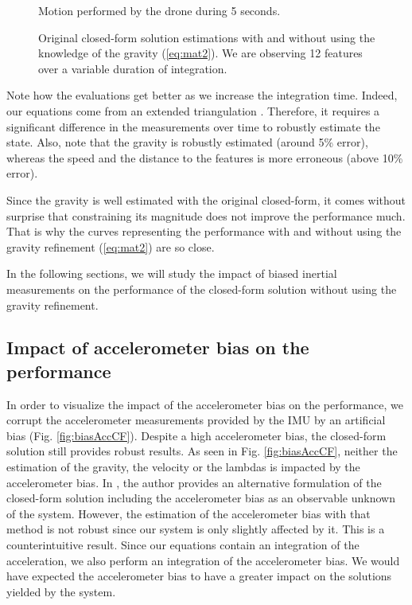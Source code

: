 \documentclass[letterpaper, 10 pt, journal, final]{ieeeconf}  %
\begin{document}
\begin{figure}
  \centering
  \resizebox{0.7\columnwidth}{!}{}
    \caption{Motion performed by the drone during 5 seconds.\label{fig:trajectory}}
\end{figure}

\begin{figure}
  \centering
    \resizebox{0.7\columnwidth}{!}{}
    \caption{Original closed-form solution estimations with and without using the knowledge of the gravity (\ref{eq:mat2}). We are observing 12 features  over a variable duration of integration.\label{fig:original}}
\end{figure}


Note how the evaluations get better as we increase the integration time.
Indeed, our equations come from an extended triangulation \cite{Martinelli2012}.
Therefore, it requires a significant difference in the measurements over time to robustly estimate the state.
Also, note that the gravity is robustly estimated (around 5\% error), whereas the speed and the distance to the features is more erroneous (above 10\% error).

Since the gravity is well estimated with the original closed-form, it comes without surprise that constraining its magnitude does not improve the performance much.
That is why the curves representing the performance with and without using the gravity refinement (\ref{eq:mat2}) are so close.

In the following sections, we will study the impact of biased inertial measurements on the performance of the closed-form solution without using the gravity refinement.

\subsection{Impact of accelerometer bias on the performance}
In order to visualize the impact of the accelerometer bias on the performance,
we corrupt the accelerometer measurements provided by the IMU by an artificial bias (Fig. \ref{fig:biasAccCF}).
Despite a high accelerometer bias, the closed-form solution still provides robust results.
As seen in Fig. \ref{fig:biasAccCF}, neither the estimation of the gravity, the velocity or the lambdas is impacted by the accelerometer bias.
In \cite{Martinelli2014}, the author provides an alternative formulation of the closed-form solution including the accelerometer bias as an observable unknown of the system.
However, the estimation of the accelerometer bias with that method is not robust since our system is only slightly affected by it.
This is a counterintuitive result. Since our equations contain an integration of the acceleration, we also perform an integration of the accelerometer bias.
We would have expected the accelerometer bias to have a greater impact on the solutions yielded by the system.
\end{document}
